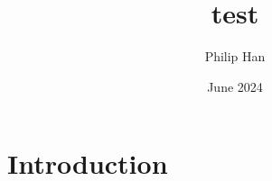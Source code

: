 \documentclass{article}
\title{test}
\author{Philip Han}
\date{June 2024}
\begin{document}
\maketitle

\section{Introduction}
\end{document}
